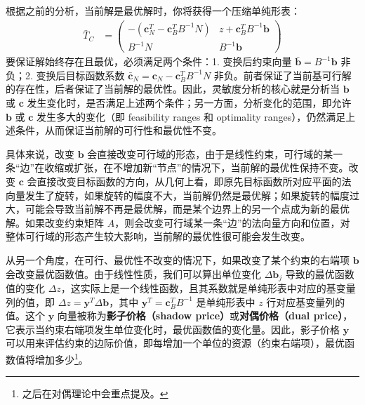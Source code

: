 \documentclass[12pt]{article}
\theoremstyle{plain}
\theoremstyle{definition}
\begin{document}
根据之前的分析，当前解是最优解时，你将获得一个压缩单纯形表：
\begin{align*}
    \bar{T}_C &= \begin{pmatrix}        
        -(\bm{c}_N^T - \bm{c}_B^T B^{-1} N) & z + \bm{c}_B^T B^{-1} \bm{b} \\
        B^{-1} N & B^{-1} \bm{b}
    \end{pmatrix}
\end{align*}
要保证解始终存在且最优，必须满足两个条件：1. 变换后约束向量 $\bar{\bm{b}} = B^{-1} \bm{b}$ 非负；2. 变换后目标函数系数 $\bar{\bm{c}}_N = \bm{c}_N - \bm{c}_B^T B^{-1} N$ 非负。前者保证了当前基可行解的存在性，后者保证了当前解的最优性。因此，灵敏度分析的核心就是分析当 $\bm{b}$ 或 $\bm{c}$ 发生变化时，是否满足上述两个条件；另一方面，分析变化的范围，即允许 $\bm{b}$ 或 $\bm{c}$ 发生多大的变化（即 feasibility ranges 和 optimality ranges），仍然满足上述条件，从而保证当前解的可行性和最优性不变。

具体来说，改变 $\bm{b}$ 会直接改变可行域的形态，由于是线性约束，可行域的某一条“边”在收缩或扩张，在不增加新“节点”的情况下，当前解的最优性保持不变。改变 $\bm{c}$ 会直接改变目标函数的方向，从几何上看，即原先目标函数所对应平面的法向量发生了旋转，如果旋转的幅度不大，当前解仍然是最优解；如果旋转的幅度过大，可能会导致当前解不再是最优解，而是某个边界上的另一个点成为新的最优解。如果改变约束矩阵 $A$，则会改变可行域某一条“边”的法向量方向和位置，对整体可行域的形态产生较大影响，当前解的最优性很可能会发生改变。

从另一个角度，在可行、最优性不改变的情况下，如果改变了某个约束的右端项 $\bm{b}$ 会改变最优函数值。由于线性性质，我们可以算出单位变化 $\Delta \bm{b}_j$ 导致的最优函数值的变化 $\Delta z$，这实际上是一个线性函数，且其系数就是单纯形表中对应的基变量列的值，即 $\Delta z = \bm{y}^T \Delta \bm{b}$，其中 $\bm{y}^T = \bm{c}_B^T B^{-1}$ 是单纯形表中 $z$ 行对应基变量列的值。这个 $\bm{y}$ 向量被称为\textbf{影子价格（shadow price）}或\textbf{对偶价格（dual price）}，它表示当约束右端项发生单位变化时，最优函数值的变化量。因此，影子价格 $\bm{y}$ 可以用来评估约束的边际价值，即每增加一个单位的资源（约束右端项），最优函数值将增加多少\footnote{之后在对偶理论中会重点提及。}。
\end{document}
